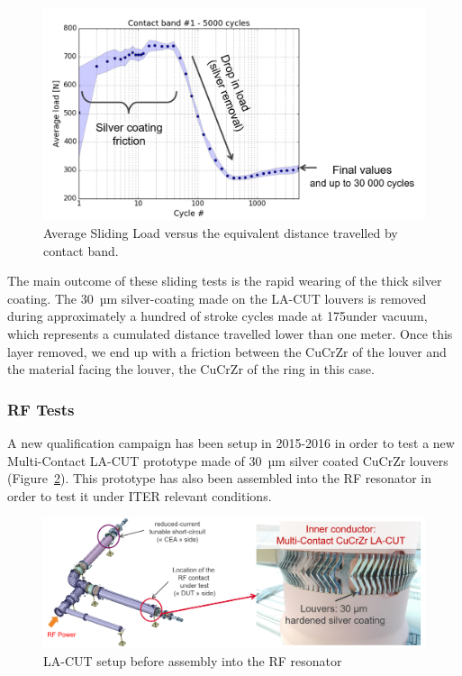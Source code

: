 {\begin{figure}[h]
	\centering
	\includegraphics[width=1.0\linewidth]{figures/chap3/RF_contacts/RF_contact_LACUT_sliding_tests_results}
	\caption{Average Sliding Load versus the equivalent distance travelled by contact band.}
	\label{fig:rfcontactlacutslidingtestsresults}
\end{figure}

The main outcome of these sliding tests is the rapid wearing of the thick silver coating. The 30~µm silver-coating made on the LA-CUT louvers is removed during approximately a hundred of stroke cycles made at 175\degC under vacuum, which represents a cumulated distance travelled lower than one meter. Once this layer removed, we end up with a friction between the CuCrZr of the louver and the material facing the louver, the CuCrZr of the ring in this case. 

\subsubsection{RF Tests}
A new qualification campaign has been setup in 2015-2016 in order to test a new Multi-Contact LA-CUT prototype made of 30~µm silver coated CuCrZr louvers (Figure~\ref{fig:rfcontactlacuttest}). This prototype has also been assembled into the RF resonator in order to test it under ITER relevant conditions. 

\begin{figure}[h]
	\centering
	\includegraphics[width=1.0\linewidth]{figures/chap3/RF_contacts/RF_contact_LACUT_test}
	\caption{LA-CUT setup before assembly into the RF resonator}
	\label{fig:rfcontactlacuttest}
\end{figure}

}
